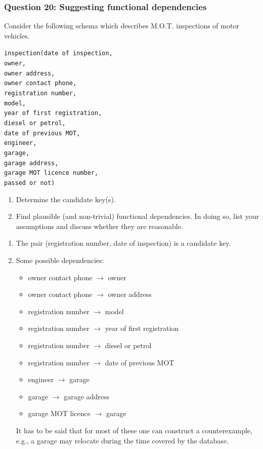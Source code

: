 \subsubsection{Question 20: Suggesting functional dependencies}

Consider the following schema which describes M.O.T. inspections of motor vehicles.

\texttt{inspection(date of inspection,\\
owner,\\
owner address,\\
owner contact phone,\\
registration number,\\
model,\\
year of first registration,\\
diesel or petrol,\\
date of previous MOT,\\
engineer,\\
garage,\\
garage address,\\
garage MOT licence number,\\
passed or not)}

\begin{enumerate}[label=\alph*.]
  \item Determine the candidate key(s).
  \item Find plausible (and non-trivial) functional dependencies. In doing so, list your assumptions and discuss
  whether they are reasonable.
\end{enumerate}

\begin{enumerate}[label=\alph*.]
  \item The pair (registration number, date of inspection) is a candidate key.

  \item Some possible dependencies:

  \begin{itemize}
    \item owner contact phone $\rightarrow$ owner
    \item owner contact phone $\rightarrow$ owner address
    \item registration number $\rightarrow$ model
    \item registration number $\rightarrow$ year of first registration
    \item registration number $\rightarrow$ diesel or petrol
    \item registration number $\rightarrow$ date of previous MOT
    \item engineer $\rightarrow$ garage
    \item garage $\rightarrow$ garage address
    \item garage MOT licence $\rightarrow$ garage
  \end{itemize}

  It has to be said that for most of these one can construct a counterexample, e.g., a garage may relocate during
  the time covered by the database.
\end{enumerate}

